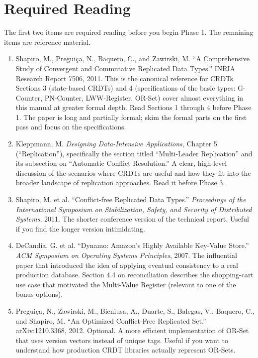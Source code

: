 \documentclass[11pt,a4paper]{article}
\begin{document}
\section{Required Reading}

The first two items are required reading before you begin Phase 1. The remaining items are reference material.

\begin{enumerate}
\item Shapiro, M., Pregui\c{c}a, N., Baquero, C., and Zawirski, M. ``A Comprehensive Study of Convergent and Commutative Replicated Data Types.'' INRIA Research Report 7506, 2011. This is the canonical reference for CRDTs. Sections 3 (state-based CRDTs) and 4 (specifications of the basic types: G-Counter, PN-Counter, LWW-Register, OR-Set) cover almost everything in this manual at greater formal depth. Read Sections 1 through 4 before Phase 1. The paper is long and partially formal; skim the formal parts on the first pass and focus on the specifications.

\item Kleppmann, M. \textit{Designing Data-Intensive Applications}, Chapter 5 (``Replication''), specifically the section titled ``Multi-Leader Replication'' and its subsection on ``Automatic Conflict Resolution.'' A clear, high-level discussion of the scenarios where CRDTs are useful and how they fit into the broader landscape of replication approaches. Read it before Phase 3.

\item Shapiro, M. et al. ``Conflict-free Replicated Data Types.'' \textit{Proceedings of the International Symposium on Stabilization, Safety, and Security of Distributed Systems}, 2011. The shorter conference version of the technical report. Useful if you find the longer version intimidating.

\item DeCandia, G. et al. ``Dynamo: Amazon's Highly Available Key-Value Store.'' \textit{ACM Symposium on Operating Systems Principles}, 2007. The influential paper that introduced the idea of applying eventual consistency to a real production database. Section 4.4 on reconciliation describes the shopping-cart use case that motivated the Multi-Value Register (relevant to one of the bonus options).

\item Pregui\c{c}a, N., Zawirski, M., Bieniusa, A., Duarte, S., Balegas, V., Baquero, C., and Shapiro, M. ``An Optimized Conflict-Free Replicated Set.'' arXiv:1210.3368, 2012. Optional. A more efficient implementation of OR-Set that uses version vectors instead of unique tags. Useful if you want to understand how production CRDT libraries actually represent OR-Sets.
\end{enumerate}

\footerboxes
\end{document}
